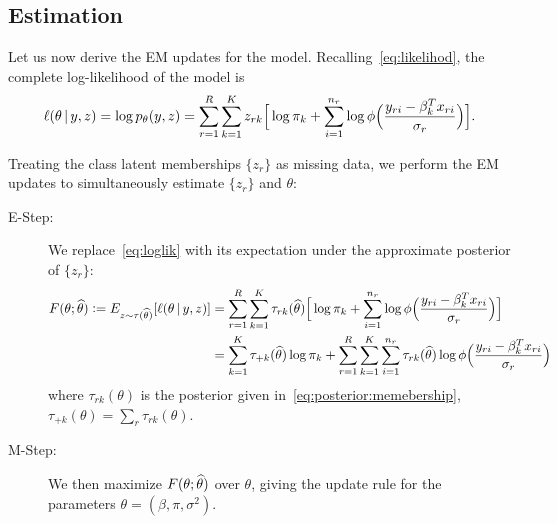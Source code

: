 \documentclass[12pt]{article}
\begin{document}
\subsection{Estimation}

Let us now derive the EM updates for the model.
Recalling~\eqref{eq:likelihod}, the complete log-likelihood of the model is
\begin{align} \label{eq:loglik}
	\ell(\theta \,|\,  y, z) = \log  p_\theta(y,z) =  \sum_{r=1}^R \sum_{k=1}^K z_{rk} \Big[\log \pi_k + \sum_{i=1}^{n_r} \log \phi\Big( \frac{y_{ri} - \beta_k^T x_{ri}}{\sigma_r} \Big) \Big].
\end{align}



Treating the class latent memberships $\{z_r\}$ as missing data, we perform the EM updates to simultaneously estimate $\{z_r\}$ and $\theta$:
\begin{description}
\item[E-Step:] We replace~\eqref{eq:loglik} with its expectation under the approximate posterior of $\{z_r\}$:%
\begin{align} 
\begin{split} \label{eq:exp_lik}
	F(\theta;\widehat\theta) := E_{z \sim \tau(\widehat\theta)} [\ell(\theta \,|\, y, z)] &=   \sum_{r=1}^R \sum_{k=1}^K \tau_{rk}(\widehat\theta) \Big[\log \pi_k + \sum_{i=1}^{n_r} \log \phi\Big( \frac{y_{ri} - \beta_k^T x_{ri}}{\sigma_r} \Big) \Big]\\
	&=\sum_{k=1}^K \tau_{+k}(\widehat\theta) \log \pi_k + 
	\sum_{r=1}^R \sum_{k=1}^K \sum_{i=1}^{n_r}  \tau_{rk}(\widehat\theta) \log \phi\Big( \frac{y_{ri} - \beta_k^T x_{ri}}{\sigma_r} \Big)
\end{split}
\end{align}
where $\tau_{rk}(\theta)$ is the posterior given in~\eqref{eq:posterior:memebership}, 
$ \tau_{+k}(\theta) = \sum_r \tau_{rk}(\theta)$. %
\item[M-Step:] We then maximize $F(\theta;\widehat\theta)$ over $\theta$, giving the update rule for the parameters $\theta = (\beta,\pi,\sigma^2)$.%
\end{description}
\end{document}
